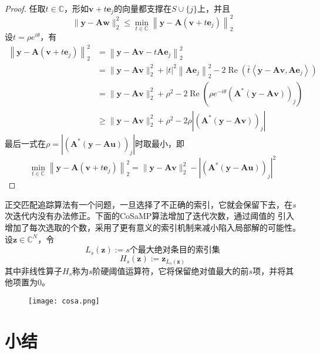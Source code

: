 \begin{proof}
任取$t \in \mathbb{C}$，形如$\mathbf{v}+t \mathbf{e}_j$的向量都支撑在$S \cup\{j\}$上，并且
\begin{equation}
    \|\mathbf{y}-\mathbf{A} \mathbf{w}\|_2^2 \leq \min _{t \in \mathbb{C}}\left\|\mathbf{y}-\mathbf{A}\left(\mathbf{v}+t \mathbf{e}_j\right)\right\|_2^2
\end{equation}
设$t=\rho e^{i \theta}$，有
\begin{equation}
    \begin{aligned}
    \left\|\mathbf{y}-\mathbf{A}\left(\mathbf{v}+t \mathbf{e}_j\right)\right\|_2^2 & =\left\|\mathbf{y}-\mathbf{A v}-t \mathbf{A} \mathbf{e}_j\right\|_2^2 \\
    & =\|\mathbf{y}-\mathbf{A v}\|_2^2+|t|^2\left\|\mathbf{A} \mathbf{e}_j\right\|_2^2-2 \operatorname{Re}\left(\bar{t}\left\langle\mathbf{y}-\mathbf{A v},\mathbf{A} \mathbf{e}_j\right\rangle\right) \\
    & =\|\mathbf{y}-\mathbf{A v}\|_2^2+\rho^2-2 \operatorname{Re}\left(\rho e^{-i \theta}\left(\mathbf{A}^*(\mathbf{y}-\mathbf{A v})\right)_j\right) \\
    & \geq\|\mathbf{y}-\mathbf{A v}\|_2^2+\rho^2-2 \rho\left|\left(\mathbf{A}^*(\mathbf{y}-\mathbf{A} \mathbf{v})\right)_j\right|
    \end{aligned}
\end{equation}
最后一式在$\rho=\left|\left(\mathbf{A}^*(\mathbf{y}-\mathbf{A} \mathbf{u})\right)_j\right|$时取最小，即
\begin{equation}
    \min _{t \in \mathbb{C}}\left\|\mathbf{y}-\mathbf{A}\left(\mathbf{v}+t \mathbf{e}_j\right)\right\|_2^2=\|\mathbf{y}-\mathbf{A v}\|_2^2-\left|\left(\mathbf{A}^*(\mathbf{y}-\mathbf{A} \mathbf{u})\right)_j\right|^2
\end{equation}
\end{proof}
正交匹配追踪算法有一个问题，一旦选择了不正确的索引，它就会保留下去，在$s$次迭代内没有办法修正。下面的CoSaMP算法增加了迭代次数，通过阈值的
引入增加了每次选取的个数，采用了更有意义的索引机制来减小陷入局部解的可能性。
设$\mathbf{z} \in \mathbb{C}^N$，令
\begin{equation}
    L_s(\mathbf{z}):=s\text{个最大绝对条目的索引集}
\end{equation}
\begin{equation}
    H_s(\mathbf{z}):=\mathbf{z}_{L_s(\mathbf{z})}
\end{equation}
其中非线性算子$H_s$称为$s$阶硬阈值运算符，它将保留绝对值最大的前$s$项，并将其他项置为0。\par
\begin{figure}[!htbp]
    \centering
    \texttt{[image: cosa.png]}
\end{figure}






\section{小结}